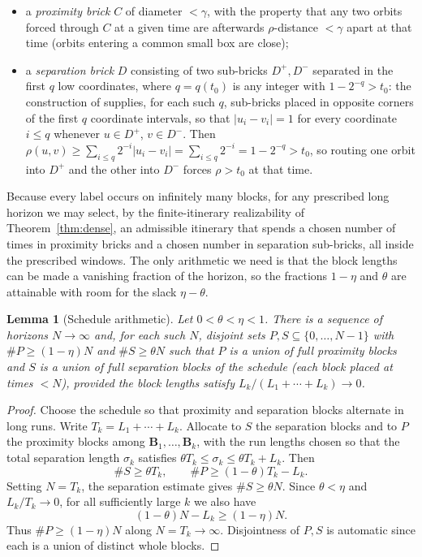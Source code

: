 \documentclass[11pt]{article}
\newtheorem{lemma}[theorem]{Lemma}
\begin{document}
\begin{itemize}
\item a \emph{proximity brick} $C$ of diameter $<\gamma$, with the property that any two
orbits forced through $C$ at a given time are afterwards $\rho$-distance $<\gamma$ apart
at that time (orbits entering a common small box are close);
\item a \emph{separation brick} $D$ consisting of two sub-bricks \(D^{+},D^{-}\) separated
in the first \(q\) low coordinates, where \(q=q(t_0)\) is any integer with
\(1-2^{-q}>t_0\): the construction of \cite[\S12]{Shmalo2026} supplies, for each such
\(q\), sub-bricks placed in opposite corners of the first \(q\) coordinate intervals, so
that \(|u_i-v_i|=1\) for every coordinate \(i\le q\) whenever \(u\in D^{+}\),
\(v\in D^{-}\).  Then \(\rho(u,v)\ge\sum_{i\le q}2^{-i}|u_i-v_i|=\sum_{i\le q}2^{-i}=
1-2^{-q}>t_0\), so routing one orbit into \(D^{+}\) and the other into \(D^{-}\) forces
\(\rho>t_0\) at that time.
\end{itemize}

Because every label occurs on infinitely many blocks, for any prescribed long horizon we
may select, by the finite-itinerary realizability of Theorem~\ref{thm:dense}, an
admissible itinerary that spends a chosen number of times in proximity bricks and a
chosen number in separation sub-bricks, all inside the prescribed windows.  The only
arithmetic we need is that the block lengths can be made a vanishing fraction of the
horizon, so the fractions \(1-\eta\) and \(\theta\) are attainable with room for the
slack \(\eta-\theta\).

\begin{lemma}[Schedule arithmetic]\label{lem:schedule}
Let \(0<\theta<\eta<1\).  There is a sequence of horizons \(N\to\infty\) and, for each
such \(N\), disjoint sets \(P,S\subseteq\{0,\dots,N-1\}\) with
\(\#P\ge(1-\eta)N\) and \(\#S\ge\theta N\) such that \(P\) is a union of full proximity
blocks and \(S\) is a union of full separation blocks of the schedule (each block placed
at times \(<N\)), provided the block lengths satisfy \(L_k/(L_1+\cdots+L_k)\to0\).
\end{lemma}

\begin{proof}
Choose the schedule so that proximity and separation blocks alternate in long runs.
Write \(T_k=L_1+\cdots+L_k\).  Allocate to \(S\) the separation blocks and to \(P\) the
proximity blocks among \(\mathbf B_1,\dots,\mathbf B_k\), with the run lengths chosen so
that the total separation length \(\sigma_k\) satisfies
\(\theta T_k\le \sigma_k\le\theta T_k+L_k\).  Then
\[
\#S\ge\theta T_k,\qquad \#P\ge(1-\theta)T_k-L_k.
\]
Setting \(N=T_k\), the separation estimate gives \(\#S\ge\theta N\).  Since
\(\theta<\eta\) and \(L_k/T_k\to0\), for all sufficiently large \(k\) we also have
\[
(1-\theta)N-L_k\ge(1-\eta)N.
\]
Thus \(\#P\ge(1-\eta)N\) along \(N=T_k\to\infty\).  Disjointness of \(P,S\) is automatic
since each is a union of distinct whole blocks.
\end{proof}
\end{document}
